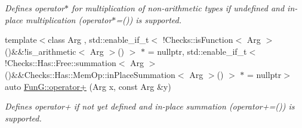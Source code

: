 \begin{DoxyCompactItemize}
\begin{DoxyCompactList}\small\item\em Defines operator$\ast$ for multiplication of non-\/arithmetic types if undefined and in-\/place multiplication (operator$\ast$=()) is supported. \end{DoxyCompactList}\item 
{\footnotesize template$<$class Arg , std\+::enable\+\_\+if\+\_\+t$<$ !\+Checks\+::is\+Function$<$ Arg $>$()\&\&!is\+\_\+arithmetic$<$ Arg $>$() $>$ $\ast$  = nullptr, std\+::enable\+\_\+if\+\_\+t$<$ !\+Checks\+::\+Has\+::\+Free\+::summation$<$ Arg $>$()\&\&\+Checks\+::\+Has\+::\+Mem\+Op\+::in\+Place\+Summation$<$ Arg $>$() $>$ $\ast$  = nullptr$>$ }\\auto \hyperlink{namespaceFunG_a063d3e8c19dbea3ee1396736fecb64e1}{Fun\+G\+::operator+} (Arg x, const Arg \&y)
\begin{DoxyCompactList}\small\item\em Defines operator+ if not yet defined and in-\/place summation (operator+=()) is supported. \end{DoxyCompactList}\end{DoxyCompactItemize}
